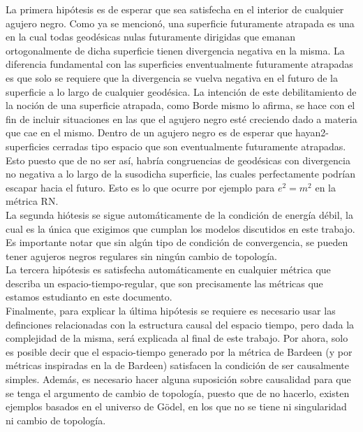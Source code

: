 \documentclass[16pt,a4paper]{article}
\numberwithin{equation}{section}
\theoremstyle{definition}
\begin{document}
La primera hipótesis es de esperar que sea satisfecha en el interior de cualquier agujero negro. Como ya se mencionó, una superficie futuramente atrapada es una en la cual todas geodésicas nulas futuramente dirigidas que emanan ortogonalmente de dicha superficie tienen divergencia negativa en la misma. La diferencia fundamental con las superficies enventualmente futuramente atrapadas es que solo se requiere que la divergencia se vuelva negativa en el futuro de la superficie a lo largo de cualquier geodésica. La intención de este debilitamiento de la noción de una superficie atrapada, como Borde mismo lo afirma, se hace con el fin de incluir situaciones en las que el agujero negro esté creciendo dado a materia que cae en el mismo. Dentro de un agujero negro es de esperar que hayan2-superficies cerradas tipo espacio que son eventualmente  futuramente atrapadas. Esto puesto que de no ser así, habría congruencias de geodésicas con divergencia no negativa a lo largo de la susodicha superficie, las cuales perfectamente podrían escapar hacia el futuro. Esto es lo que ocurre por ejemplo para $e^2 = m^2$ en la métrica RN.\\

La segunda hiótesis se sigue automáticamente de la condición de energía débil, la cual es la única que exigimos que cumplan los modelos discutidos en este trabajo. Es importante notar que sin algún tipo de condición de convergencia, se pueden tener agujeros negros regulares sin ningún cambio de topología.\\

La tercera hipótesis es satisfecha automáticamente en cualquier métrica que describa un espacio-tiempo-regular, que son precisamente las métricas que estamos estudianto en este documento.\\

Finalmente, para explicar la última hipótesis se requiere es necesario usar las definciones relacionadas con la estructura causal del espacio tiempo, pero dada la complejidad de la misma, será explicada al final de este trabajo. Por ahora, solo es posible decir que el espacio-tiempo generado por la métrica de Bardeen (y por métricas inspiradas en la de Bardeen) satisfacen la condición de ser causalmente simples. Además, es necesario hacer alguna suposición sobre causalidad para que se tenga el argumento de cambio de topología, puesto que de no hacerlo, existen ejemplos basados en el universo de Gödel, en los que no se tiene ni singularidad ni cambio de topología.\\
\end{document}
